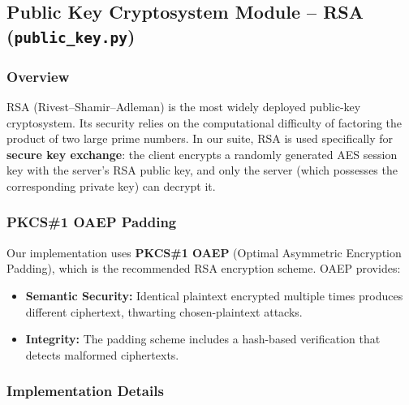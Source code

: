 \documentclass[12pt,a4paper]{article}
\begin{document}
\subsection{Public Key Cryptosystem Module – RSA (\texttt{public\_key.py})}

\subsubsection{Overview}
RSA (Rivest--Shamir--Adleman) is the most widely deployed public-key cryptosystem. Its security relies on the computational difficulty of factoring the product of two large prime numbers. In our suite, RSA is used specifically for \textbf{secure key exchange}: the client encrypts a randomly generated AES session key with the server's RSA public key, and only the server (which possesses the corresponding private key) can decrypt it.

\subsubsection{PKCS\#1 OAEP Padding}
Our implementation uses \textbf{PKCS\#1 OAEP} (Optimal Asymmetric Encryption Padding), which is the recommended RSA encryption scheme. OAEP provides:
\begin{itemize}
    \item \textbf{Semantic Security:} Identical plaintext encrypted multiple times produces different ciphertext, thwarting chosen-plaintext attacks.
    \item \textbf{Integrity:} The padding scheme includes a hash-based verification that detects malformed ciphertexts.
\end{itemize}

\subsubsection{Implementation Details}
\end{document}
